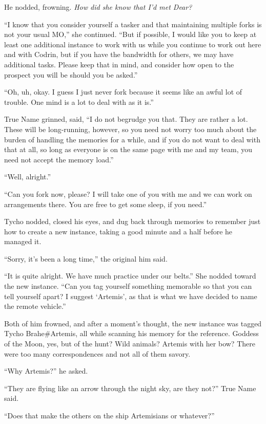 He nodded, frowning. \emph{How did she know that I'd met Dear?}

``I know that you consider yourself a tasker and that maintaining multiple forks is not your usual MO,'' she continued. ``But if possible, I would like you to keep at least one additional instance to work with us while you continue to work out here and with Codrin, but if you have the bandwidth for others, we may have additional tasks. Please keep that in mind, and consider how open to the prospect you will be should you be asked.''

``Oh, uh, okay. I guess I just never fork because it seems like an awful lot of trouble. One mind is a lot to deal with as it is.''

True Name grinned, said, ``I do not begrudge you that. They are rather a lot. These will be long-running, however, so you need not worry too much about the burden of handling the memories for a while, and if you do not want to deal with that at all, so long as everyone is on the same page with me and my team, you need not accept the memory load.''

``Well, alright.''

``Can you fork now, please? I will take one of you with me and we can work on arrangements there. You are free to get some sleep, if you need.''

Tycho nodded, closed his eyes, and dug back through memories to remember just how to create a new instance, taking a good minute and a half before he managed it.

``Sorry, it's been a long time,'' the original him said.

``It is quite alright. We have much practice under our belts.'' She nodded toward the new instance. ``Can you tag yourself something memorable so that you can tell yourself apart? I suggest `Artemis', as that is what we have decided to name the remote vehicle.''

Both of him frowned, and after a moment's thought, the new instance was tagged Tycho Brahe\#Artemis, all while scanning his memory for the reference. Goddess of the Moon, yes, but of the hunt? Wild animals? Artemis with her bow? There were too many correspondences and not all of them savory.

``Why Artemis?'' he asked.

``They are flying like an arrow through the night sky, are they not?'' True Name said.

``Does that make the others on the ship Artemisians or whatever?''


